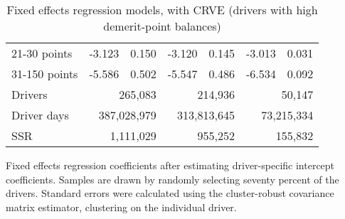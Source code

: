 \begin{table}
\begin{tabular}{l r r r r r r}
21-30 points  & -3.123  &  0.150  & -3.120  &  0.145  & -3.013  &  0.031   \\ 
 
31-150 points  & -5.586  &  0.502  & -5.547  &  0.486  & -6.534  &  0.092   \\ 
 

\hline 
 

Drivers 
 & \multicolumn{2}{r}{265,083}  & \multicolumn{2}{r}{214,936}  & \multicolumn{2}{r}{50,147}   \\ 
 

Driver days 
 & \multicolumn{2}{r}{387,028,979}  & \multicolumn{2}{r}{313,813,645}  & \multicolumn{2}{r}{73,215,334}   \\ 
 

SSR 
 & \multicolumn{2}{r}{1,111,029}  & \multicolumn{2}{r}{955,252}  & \multicolumn{2}{r}{155,832}   \\ 
 

\hline 
 
\end{tabular} 
\caption{Fixed effects regression models, with CRVE (drivers with high demerit-point balances)} 
Fixed effects regression coefficients after estimating driver-specific intercept coefficients. 
Samples are drawn by randomly selecting seventy percent of the drivers. 
Standard errors were calculated using the cluster-robust covariance matrix estimator, 
clustering on the individual driver. 
\label{tab:FE_regs_CRVE_high_pts} 
\end{table} 
 
